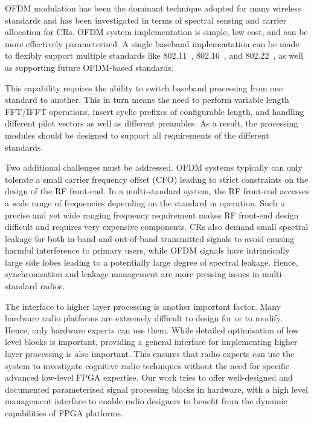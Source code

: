 OFDM modulation has been the dominant technique adopted for many wireless standards and has been investigated in terms of spectral sensing and carrier allocation for CRs.
OFDM system implementation is simple, low cost, and can be more effectively parameterised.
A single baseband implementation can be made to flexibly support multiple standards like 802.11~\cite{IEEE80211}, 802.16~\cite{IEEE80216}, and 802.22~\cite{IEEE80222}, as well as supporting future OFDM-based standards.


This capability requires the ability to switch baseband processing from one standard to another. This in turn means the need to perform variable length FFT/IFFT operations, insert cyclic prefixes of configurable length, and handling different pilot vectors as well as different preambles. As a result, the processing modules should be designed to support all requirements of the different standards.

Two additional challenges must be addressed.
OFDM systems typically can only tolerate a small carrier frequency offset (CFO) leading to strict constraints on the design of the RF front-end.
In a multi-standard system, the RF front-end accesses a wide range of frequencies depending on the standard in operation. Such a precise and yet wide ranging frequency requirement makes RF front-end design difficult and requires very expensive components.
CRs also demand small spectral leakage for both in-band and out-of-band transmitted signals to avoid causing harmful interference to primary users, while OFDM signals have intrinsically large side lobes leading to a potentially large degree of spectral leakage.
Hence, synchronisation and leakage management are more pressing issues in multi-standard radios.

The interface to higher layer processing is another important factor. Many hardware radio platforms are extremely difficult to design for or to modify. Hence, only hardware experts can use them. While detailed optimisation of low level blocks is important, providing a general interface for implementing higher layer processing is also important. This ensures that radio experts can use the system to investigate cognitive radio techniques without the need for specific advanced low-level FPGA expertise.
Our work tries to offer well-designed and documented parameterised signal processing blocks in hardware, with a high level management interface to enable radio designers to benefit from the dynamic capabilities of FPGA platforms.

